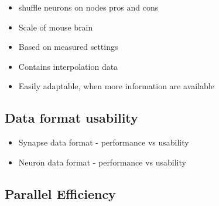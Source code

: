 \documentclass[a4paper]{article}
\begin{document}
\begin{itemize}
	  \item shuffle neurons on nodes pros and cons
      \item Scale of mouse brain
      \item Based on measured settings
      \item Contains interpolation data
      \item Easily adaptable, when more information are available
\end{itemize}


\subsection{Data format usability}
\begin{itemize}
      \item Synapse data format - performance vs usability
      \item Neuron data format - performance vs usability
\end{itemize}

\subsection{Parallel Efficiency}
\end{document}
